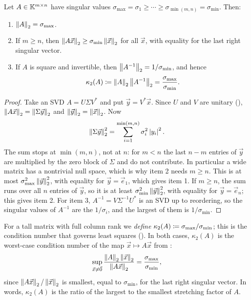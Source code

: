 \begin{theorem}
  \label{thm:twonorm}
  Let $A \in \mathbb{K}^{m \times n}$ have singular values $\sigma_{\max} = \sigma_1 \ge \cdots \ge \sigma_{\min(m,n)} = \sigma_{\min}$. Then:
  \begin{enumerate}
    \item $\left\lVert A \right\rVert_2 = \sigma_{\max}$.
    \item If $m \ge n$, then $\left\lVert A\vec{x} \right\rVert_2 \ge \sigma_{\min}\left\lVert \vec{x} \right\rVert_2$ for all $\vec{x}$, with equality for the last right singular vector.
    \item If $A$ is square and invertible, then $\left\lVert A^{-1} \right\rVert_2 = 1/\sigma_{\min}$, and hence
    \begin{equation}
      \kappa_2(A) \coloneqq \left\lVert A \right\rVert_2\left\lVert A^{-1} \right\rVert_2 = \frac{\sigma_{\max}}{\sigma_{\min}}.
    \end{equation}
  \end{enumerate}
\end{theorem}

\begin{proof}
  Take an SVD $A = U\Sigma V^\ast$ and put $\vec{y} = V^\ast\vec{x}$. Since $U$ and $V$ are unitary (), $\left\lVert A\vec{x} \right\rVert_2 = \left\lVert \Sigma\vec{y} \right\rVert_2$ and $\left\lVert \vec{y} \right\rVert_2 = \left\lVert \vec{x} \right\rVert_2$. Now
  \begin{equation}
    \left\lVert \Sigma\vec{y} \right\rVert_2^2 = \sum_{i=1}^{\min(m,n)}\sigma_i^2\left\lvert y_i \right\rvert^2.
  \end{equation}
  The sum stops at $\min(m, n)$, not at $n$: for $m < n$ the last $n - m$ entries of $\vec{y}$ are multiplied by the zero block of $\Sigma$ and do not contribute. In particular a wide matrix has a nontrivial null space, which is why item 2 needs $m \ge n$.
  This is at most $\sigma_{\max}^2\left\lVert \vec{y} \right\rVert_2^2$, with equality for $\vec{y} = \vec{e}_1$, which gives item 1. If $m \ge n$, the sum runs over all $n$ entries of $\vec{y}$, so it is at least $\sigma_{\min}^2\left\lVert \vec{y} \right\rVert_2^2$, with equality for $\vec{y} = \vec{e}_n$; this gives item 2. For item 3, $A^{-1} = V\Sigma^{-1}U^\ast$ is an SVD up to reordering, so the singular values of $A^{-1}$ are the $1/\sigma_i$, and the largest of them is $1/\sigma_{\min}$.
\end{proof}

For a tall matrix with full column rank we \emph{define} $\kappa_2(A) \coloneqq \sigma_{\max}/\sigma_{\min}$; this is the condition number that governs least squares (). In both cases, $\kappa_2(A)$ is the worst-case condition number of the map $\vec{x} \mapsto A\vec{x}$ from :
\begin{equation}
  \sup_{\vec{x} \ne \vec{0}}\frac{\left\lVert A \right\rVert_2\left\lVert \vec{x} \right\rVert_2}{\left\lVert A\vec{x} \right\rVert_2} = \frac{\sigma_{\max}}{\sigma_{\min}},
\end{equation}
since $\left\lVert A\vec{x} \right\rVert_2/\left\lVert \vec{x} \right\rVert_2$ is smallest, equal to $\sigma_{\min}$, for the last right singular vector. In words, $\kappa_2(A)$ is the ratio of the largest to the smallest stretching factor of $A$.

